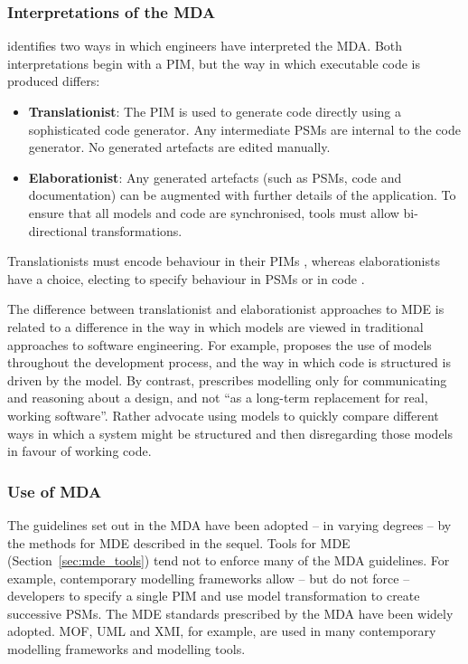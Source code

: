 \subsubsection{Interpretations of the MDA}
\cite{mcneile03mda} identifies two ways in which engineers have interpreted the MDA. Both interpretations begin with a PIM, but the way in which executable code is produced differs:

\begin{itemize}
 \item \textbf{Translationist}: The PIM is used to generate code directly using a sophisticated code generator. Any intermediate PSMs are internal to the code generator. No generated artefacts are edited manually.
 \item \textbf{Elaborationist}: Any generated artefacts (such as PSMs, code and documentation) can be augmented with further details of the application. To ensure that all models and code are synchronised, tools must allow bi-directional transformations.
\end{itemize}

Translationists must encode behaviour in their PIMs \cite{mellor02executable}, whereas elaborationists have a choice, electing to specify behaviour in PSMs or in code \cite{kleppe03mda}.

The difference between translationist and elaborationist approaches to MDE is related to a difference in the way in which models are viewed in traditional approaches to software engineering. For example, \cite{evans04domain} proposes the use of models throughout the development process, and the way in which code is structured is driven by the model. By contrast, \cite[ch. 14]{martin06agile} prescribes modelling only for communicating and reasoning about a design, and not ``as a long-term replacement for real, working software''. Rather \cite{martin06agile} advocate using models to quickly compare different ways in which a system might be structured and then disregarding those models in favour of working code.

\subsubsection{Use of MDA}
The guidelines set out in the MDA have been adopted -- in varying degrees -- by the methods for MDE described in the sequel. Tools for MDE (Section~\ref{sec:mde_tools}) tend not to enforce many of the MDA guidelines. For example, contemporary modelling frameworks allow -- but do not force -- developers to specify a single PIM and use model transformation to create successive PSMs. The MDE standards prescribed by the MDA have been widely adopted. MOF, UML and XMI, for example, are used in many contemporary modelling frameworks and modelling tools. 

